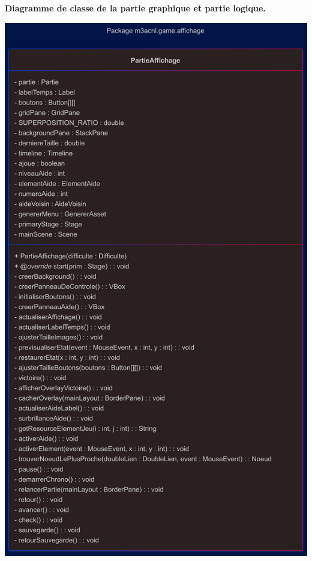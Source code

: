 \pagebreak

\textbf{Diagramme de classe de la partie graphique et partie logique.}\\
\begin{center}
    \includegraphics[width=\textwidth,height=\dimexpr\textheight-40pt\relax,keepaspectratio]{../Annexe/classes/gameAffichage.png}
\end{center}

\pagebreak

